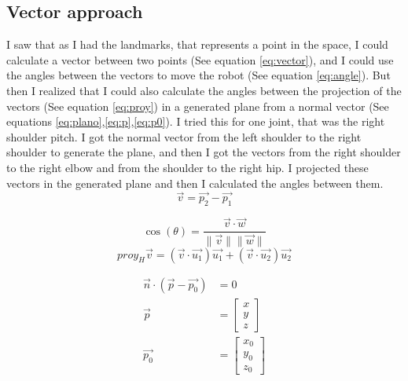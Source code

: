 \documentclass[conference]{IEEEtran}
\begin{document}
\subsection{Vector approach}
I saw that as I had the landmarks, that represents a point in the space, I could calculate a vector between two points (See equation \ref{eq:vector}), and I could use the angles between the vectors to move the robot (See equation \ref{eq:angle}). But then I realized that I could also calculate the angles between the projection of the vectors (See equation \ref{eq:proy}) in a generated plane from a normal vector (See equations \ref{eq:plano},\ref{eq:p},\ref{eq:p0}). I tried this for one joint, that was the right shoulder pitch. I got the normal vector from the left shoulder to the right shoulder to generate the plane, and then I got the vectors from the right shoulder to the right elbow and from the shoulder to the right hip. I projected these vectors in the generated plane and then I calculated the angles between them. 
\begin{equation}\label{eq:vector}
    \vec{v} = \vec{p_2} - \vec{p_1}
\end{equation}

\begin{equation}\label{eq:angle}
    \cos(\theta) = \frac{\vec{v} \cdot \vec{w}}{\| \vec{v} \| \| \vec{w} \|}
\end{equation}
\begin{equation}\label{eq:proy}
    proy_H \vec{v} = \left( \vec{v} \cdot \vec{u_1} \right) \vec{u_1} + \left( \vec{v} \cdot \vec{u_2} \right) \vec{u_2}
\end{equation}


 \begin{subequations}
    \begin{align}
        \vec{n} \cdot (\vec{p} - \vec{p_0}) &= 0 \label{eq:plano} \\
        \vec{p} &= \begin{bmatrix}
        x \\
        y \\
        z
        \end{bmatrix} \label{eq:p} \\
        \vec{p_0} &= \begin{bmatrix}
        x_0 \\
        y_0 \\
        z_0
        \end{bmatrix} \label{eq:p0}
    \end{align}
 \end{subequations}
\end{document}

